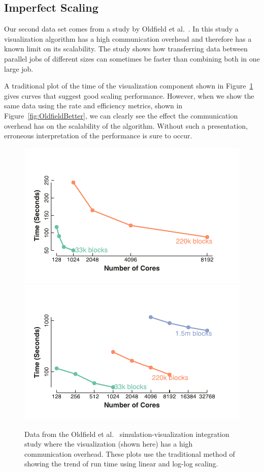 \documentclass{llncs}
\newcommand*{\scite}[1]{~\cite{#1}}
\newcommand{\etal}{et al.\xspace}
\begin{document}

\subsection{Imperfect Scaling}

\noindent
Our second data set comes from a study by Oldfield
\etal\scite{Oldfield2014}. In this study a visualization
algorithm has a high communication overhead and therefore has a known limit
on its scalability. The study shows how transferring data between parallel
jobs of different sizes can sometimes be faster than combining both in one
large job.

A traditional plot of the time of the visualization component shown in
Figure~\ref{fig:OldfieldTraditional} gives curves that suggest good scaling
performance. However, when we show the same data using the rate and
efficiency metrics, shown in Figure~\ref{fig:OldfieldBetter}, we can
clearly see the effect the communication overhead has on the scalability of
the algorithm. Without such a presentation, erroneous interpretation of the
performance is sure to occur.

\begin{figure}[htb]
  \centering
  \includegraphics[width=.48\linewidth]{images/OldfieldTimeLinear}
  \includegraphics[width=.48\linewidth]{images/OldfieldTimeLog}
  \caption{Data from the Oldfield \etal\scite{Oldfield2014}
    simulation-visualization integration study where the visualization
    (shown here) has a high communication overhead. These plots use the
    traditional method of showing the trend of run time using linear and
    log-log scaling.}
  \label{fig:OldfieldTraditional}
\end{figure}
\end{document}

